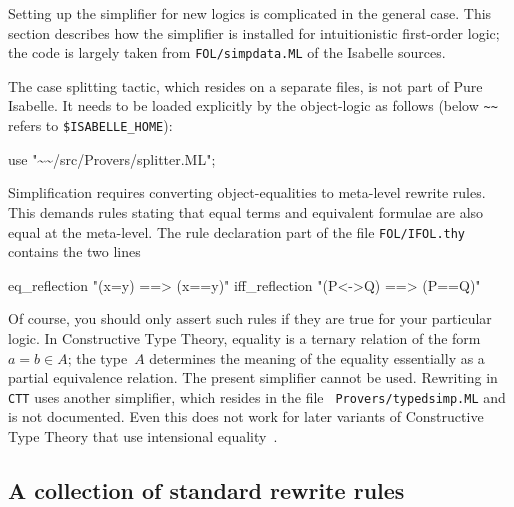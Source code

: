 Setting up the simplifier for new logics is complicated in the general case.
This section describes how the simplifier is installed for intuitionistic
first-order logic; the code is largely taken from {\tt FOL/simpdata.ML} of the
Isabelle sources.

The case splitting tactic, which resides on a separate files, is not part of
Pure Isabelle.  It needs to be loaded explicitly by the object-logic as
follows (below \texttt{\~\relax\~\relax} refers to \texttt{\$ISABELLE_HOME}):
\begin{ttbox}
use "\~\relax\~\relax/src/Provers/splitter.ML";
\end{ttbox}

Simplification requires converting object-equalities to meta-level rewrite
rules.  This demands rules stating that equal terms and equivalent formulae
are also equal at the meta-level.  The rule declaration part of the file
\texttt{FOL/IFOL.thy} contains the two lines
\begin{ttbox}
eq_reflection   "(x=y)   ==> (x==y)"
iff_reflection  "(P<->Q) ==> (P==Q)"
\end{ttbox}
Of course, you should only assert such rules if they are true for your
particular logic.  In Constructive Type Theory, equality is a ternary
relation of the form $a=b\in A$; the type~$A$ determines the meaning
of the equality essentially as a partial equivalence relation.  The
present simplifier cannot be used.  Rewriting in \texttt{CTT} uses
another simplifier, which resides in the file {\tt
  Provers/typedsimp.ML} and is not documented.  Even this does not
work for later variants of Constructive Type Theory that use
intensional equality~\cite{nordstrom90}.


\subsection{A collection of standard rewrite rules}

